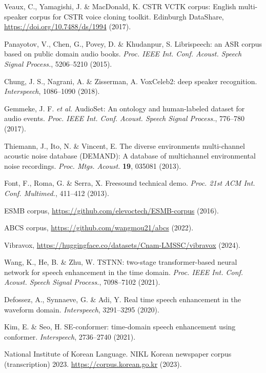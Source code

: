 \documentclass[10pt]{wlscirep}
\begin{document}
\begin{thebibliography}{99}
Veaux, C., Yamagishi, J. \& MacDonald, K. CSTR VCTK corpus: English multi-speaker corpus for CSTR voice cloning toolkit.
Edinburgh DataShare, \url{https://doi.org/10.7488/ds/1994} (2017).

Panayotov, V., Chen, G., Povey, D. \& Khudanpur, S. Librispeech: an ASR corpus based on public domain audio books.
\textit{Proc. IEEE Int. Conf. Acoust. Speech Signal Process.}, 5206–5210 (2015).

Chung, J. S., Nagrani, A. \& Zisserman, A. VoxCeleb2: deep speaker recognition.
\textit{Interspeech}, 1086–1090 (2018).

Gemmeke, J. F. \textit{et al.} AudioSet: An ontology and human-labeled dataset for audio events.
\textit{Proc. IEEE Int. Conf. Acoust. Speech Signal Process.}, 776–780 (2017).

Thiemann, J., Ito, N. \& Vincent, E. The diverse environments multi-channel acoustic noise database (DEMAND): A database of multichannel environmental noise recordings.
\textit{Proc. Mtgs. Acoust.} \textbf{19}, 035081 (2013).

Font, F., Roma, G. \& Serra, X. Freesound technical demo.
\textit{Proc. 21st ACM Int. Conf. Multimed.}, 411–412 (2013).

ESMB corpus, \url{https://github.com/elevoctech/ESMB-corpus} (2016).

ABCS corpus, \url{https://github.com/wangmou21/abcs} (2022).

Vibravox, \url{https://huggingface.co/datasets/Cnam-LMSSC/vibravox} (2024).

Wang, K., He, B. \& Zhu, W. TSTNN: two-stage transformer-based neural network for speech enhancement in the time domain.
\textit{Proc. IEEE Int. Conf. Acoust. Speech Signal Process.}, 7098–7102 (2021).

Defossez, A., Synnaeve, G. \& Adi, Y. Real time speech enhancement in the waveform domain.
\textit{Interspeech}, 3291–3295 (2020).

Kim, E. \& Seo, H. SE-conformer: time-domain speech enhancement using conformer.
\textit{Interspeech}, 2736–2740 (2021).

National Institute of Korean Language. NIKL Korean newspaper corpus (transcription) 2023.
\url{https://corpus.korean.go.kr} (2023).


\end{thebibliography}
\end{document}
